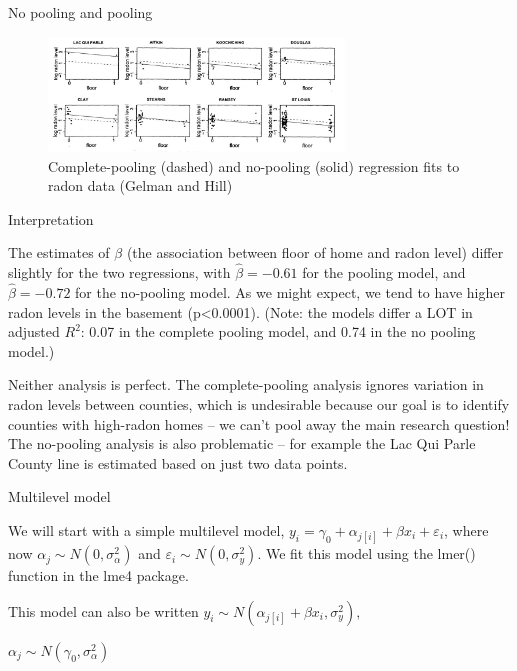 \documentclass[ignorenonframetext,]{beamer}
\begin{document}
\begin{frame}{No pooling and pooling}

\begin{figure}
\centering
\includegraphics[width=0.70000\textwidth]{figures/gelman2.jpg}
\caption{Complete-pooling (dashed) and no-pooling (solid) regression
fits to radon data (Gelman and Hill)}
\end{figure}

\end{frame}

\begin{frame}{Interpretation}

The estimates of \(\beta\) (the association between floor of home and
radon level) differ slightly for the two regressions, with
\(\widehat{\beta}=-0.61\) for the pooling model, and
\(\widehat{\beta}=-0.72\) for the no-pooling model. As we might expect,
we tend to have higher radon levels in the basement
(p\textless{}0.0001). (Note: the models differ a LOT in adjusted
\(R^2\): 0.07 in the complete pooling model, and 0.74 in the no pooling
model.)

Neither analysis is perfect. The complete-pooling analysis ignores
variation in radon levels between counties, which is undesirable because
our goal is to identify counties with high-radon homes -- we can't pool
away the main research question! The no-pooling analysis is also
problematic -- for example the Lac Qui Parle County line is estimated
based on just two data points.

\end{frame}

\begin{frame}{Multilevel model}

We will start with a simple multilevel model,
\(y_i=\gamma_0 + \alpha_{j[i]}+\beta x_i + \varepsilon_i\), where now
\(\alpha_{j} \sim N(0,\sigma^2_\alpha)\) and
\(\varepsilon_i \sim N(0, \sigma^2_y)\). We fit this model using the
lmer() function in the lme4 package.

This model can also be written
\(y_i \sim N(\alpha_{j[i]}+\beta x_i, \sigma_y^2),\)

\(\alpha_j \sim N\left(\gamma_0,\sigma_\alpha^2 \right)\)

\end{frame}
\end{document}
